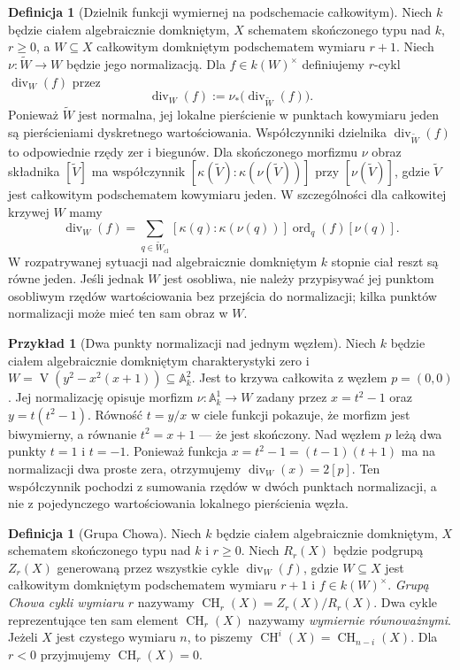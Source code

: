 \documentclass[11pt,a4paper,openany]{report}
\numberwithin{equation}{section}
\theoremstyle{plain}
\theoremstyle{definition}
\newtheorem{definicja}[twierdzenie]{Definicja}
\newtheorem{przyklad}[twierdzenie]{Przykład}
\theoremstyle{remark}
\newcommand{\A}{\mathbb A}
\newcommand{\V}{\operatorname V}
\begin{document}
\begin{definicja}[Dzielnik funkcji wymiernej na podschemacie całkowitym]
\label{def:ga7-rational-divisor}
Niech $k$ będzie ciałem algebraicznie domkniętym,
$X$ schematem skończonego typu nad $k$, $r\ge0$,
a $W\subseteq X$ całkowitym domkniętym podschematem
wymiaru $r+1$. Niech $\nu:\widetilde W\to W$
będzie jego normalizacją. Dla $f\in k(W)^\times$ definiujemy
$r$-cykl $\operatorname{div}_W(f)$ przez
\[
\operatorname{div}_W(f):=\nu_*
\bigl(\operatorname{div}_{\widetilde W}(f)\bigr).
\]
Ponieważ $\widetilde W$ jest normalna, jej lokalne
pierścienie w punktach kowymiaru jeden są pierścieniami
dyskretnego wartościowania. Współczynniki dzielnika
$\operatorname{div}_{\widetilde W}(f)$ to odpowiednie rzędy
zer i biegunów. Dla skończonego morfizmu $\nu$ obraz
składnika $[\widetilde V]$ ma współczynnik
$[\kappa(\widetilde V):\kappa(\nu(\widetilde V))]$ przy
$[\nu(\widetilde V)]$, gdzie $\widetilde V$ jest
całkowitym podschematem kowymiaru jeden.
W szczególności dla całkowitej krzywej $W$ mamy
\[
\operatorname{div}_W(f)=
\sum_{q\in\widetilde W_{\mathrm{cl}}}
[\kappa(q):\kappa(\nu(q))]\operatorname{ord}_q(f)[\nu(q)].
\]
W rozpatrywanej sytuacji nad algebraicznie domkniętym
$k$ stopnie ciał reszt są równe jeden. Jeśli jednak
$W$ jest osobliwa, nie należy przypisywać jej punktom
osobliwym rzędów wartościowania bez przejścia
do normalizacji; kilka punktów normalizacji może
mieć ten sam obraz w $W$.
\end{definicja}

\begin{przyklad}[Dwa punkty normalizacji nad jednym węzłem]
\label{prz:ga7-nodal-divisor}
Niech $k$ będzie ciałem algebraicznie domkniętym
charakterystyki zero i
$W=\V(y^2-x^2(x+1))\subseteq\A_k^2$.
Jest to krzywa całkowita z węzłem $p=(0,0)$.
Jej normalizację opisuje morfizm
$\nu:\A_k^1\to W$ zadany przez
$x=t^2-1$ oraz $y=t(t^2-1)$.
Równość $t=y/x$ w ciele funkcji pokazuje,
że morfizm jest biwymierny, a równanie
$t^2=x+1$ — że jest skończony.
Nad węzłem $p$ leżą dwa punkty $t=1$ i $t=-1$.
Ponieważ funkcja $x=t^2-1=(t-1)(t+1)$
ma na normalizacji dwa proste zera,
otrzymujemy $\operatorname{div}_W(x)=2[p]$.
Ten współczynnik pochodzi z sumowania rzędów
w dwóch punktach normalizacji, a nie z pojedynczego
wartościowania lokalnego pierścienia węzła.
\end{przyklad}

\begin{definicja}[Grupa Chowa]
\label{def:ga7-chow}
Niech $k$ będzie ciałem algebraicznie domkniętym,
$X$ schematem skończonego typu nad $k$ i $r\ge0$.
Niech $R_r(X)$ będzie podgrupą $Z_r(X)$ generowaną przez
wszystkie cykle $\operatorname{div}_W(f)$, gdzie
$W\subseteq X$ jest całkowitym domkniętym podschematem
wymiaru $r+1$ i $f\in k(W)^\times$.
\emph{Grupą Chowa cykli wymiaru $r$} nazywamy
$\operatorname{CH}_r(X)=Z_r(X)/R_r(X)$.
Dwa cykle reprezentujące ten sam element $\operatorname{CH}_r(X)$
nazywamy \emph{wymiernie równoważnymi}.
Jeżeli $X$ jest czystego wymiaru $n$, to piszemy
$\operatorname{CH}^i(X)=\operatorname{CH}_{n-i}(X)$.
Dla $r<0$ przyjmujemy $\operatorname{CH}_r(X)=0$.
\end{definicja}
\end{document}
